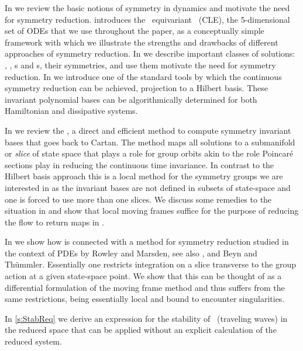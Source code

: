 In  we review the basic notions of symmetry
in dynamics and motivate the need for symmetry reduction.
 introduces the \ equivariant
\cLe\ (CLE), the 5-dimensional set of ODEs that we use
throughout the paper, as a conceptually  simple framework
with which we illustrate the strengths and drawbacks of different
approaches of symmetry reduction.
In  we describe important classes of
solutions: \eqva, \reqva, \po s and \rpo s, their symmetries,
and use them motivate the need for symmetry reduction.
In  we introduce one of the standard tools
by which the continuous symmetry reduction can be achieved,
projection to a Hilbert basis. These invariant polynomial
bases can be algorithmically determined
for both Hamiltonian and dissipative systems.

In  we review the \emph{\mframes}, a direct
and efficient method to compute symmetry invariant bases that
goes back to Cartan. The method maps all solutions to a
submanifold or \emph{slice} of state space that plays a role
for group orbits akin to the role Poincar\'e sections play in
reducing the continuous time invariance. In contrast to the
Hilbert basis approach this is a local method for the
symmetry groups we are interested in as the invariant bases
are not defined in subsets of state-space and one is forced
to use more than one slices. We discuss some remedies to the
situation in 
and show that local moving frames suffice for the purpose of
reducing the flow to return maps in .

In  we show how {\mframes} is
connected with a method for symmetry reduction studied in the
context of PDEs by Rowley and
Marsden, see also
, and Beyn and
Th\"ummler.
Essentially one restricts integration on a slice transverse
to the group action at a given state-space point. We show
that this can be thought of as a differential formulation of
the moving frame method and thus suffers from the same
restrictions, being essentially local and bound to encounter
singularities.

In \ref{s:StabReq} we derive an expression for the stability
of \reqva\ (traveling waves) in the reduced space
that can be applied without an explicit
calculation of the reduced system.
